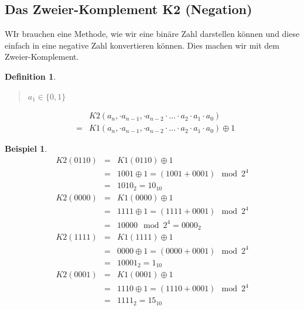 \documentclass{report}
\newtheorem{mydef}{Definition}
\newtheorem{myexample}{Beispiel}
\begin{document}
\subsection{Das Zweier-Komplement K2 (Negation)}
WIr brauchen eine Methode, wie wir eine binäre Zahl darstellen können und diese einfach in eine negative Zahl konvertieren können. Dies machen wir mit dem Zweier-Komplement.
\begin{mydef}\begin{quote}$a_1 \in \{0, 1\}$\end{quote}\begin{eqnarray}
& &K2(a_n, \cdot a_{n-1}, \cdot a_{n-2} \cdot ... \cdot a_2 \cdot a_1 \cdot a_0) \nonumber \\
&=&K1(a_n, \cdot a_{n-1}, \cdot a_{n-2} \cdot ... \cdot a_2 \cdot a_1 \cdot a_0) \oplus 1 \end{eqnarray}\end{mydef}
\begin{myexample}\begin{eqnarray}K2(0110) &=& K1(0110) \oplus 1 \nonumber \\
&=&1001 \oplus 1 = (1001 + 0001) \mod 2^4 \nonumber \\
&=&1010_2 = 10_{10}\end{eqnarray}
\begin{eqnarray}K2(0000) &=& K1(0000) \oplus 1 \nonumber \\
&=&1111 \oplus 1 = (1111 + 0001) \mod 2^4 \nonumber \\
&=&10000 \mod 2^4 = 0000_2\end{eqnarray}
\begin{eqnarray}K2(1111) &=& K1(1111) \oplus 1 \nonumber \\
&=&0000 \oplus 1 = (0000 + 0001) \mod 2^4 \nonumber \\
&=&10001_2 = 1_{10}\end{eqnarray}
\begin{eqnarray}K2(0001) &=& K1(0001) \oplus 1 \nonumber \\
&=&1110 \oplus 1 = (1110 + 0001) \mod 2^4 \nonumber \\
&=&1111_2 = 15_{10}\end{eqnarray}\end{myexample}
\end{document}
